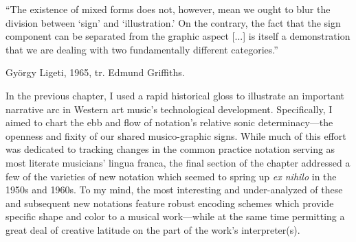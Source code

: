 


\epigraph{\singlespacing ``The existence of mixed forms does not, however, mean we ought to blur the division between `sign' and `illustration.' On the contrary, the fact that the sign component can be separated from the graphic aspect [...] is itself a demonstration that we are dealing with two fundamentally different categories.''}{György Ligeti, 1965, tr. Edmund Griffiths.}




    In the previous chapter, I used a rapid historical gloss to illustrate an important narrative arc in Western art music's technological development. Specifically, I aimed to chart the ebb and flow of notation's relative sonic determinacy---the openness and fixity of our shared musico-graphic signs. While much of this effort was dedicated to tracking changes in the common practice notation serving as most literate musicians' lingua franca, the final section of the chapter addressed a few of the varieties of new notation which seemed to spring up \textit{ex nihilo} in the 1950s and 1960s. To my mind, the most interesting and under-analyzed of these and subsequent new notations feature robust encoding schemes which provide specific shape and color to a musical work---while at the same time permitting a great deal of creative latitude on the part of the work's interpreter(s).
    
